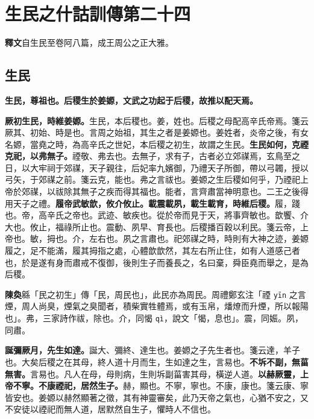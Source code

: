 \chapter{生民之什詁訓傳第二十四}

\begin{quoting}\textbf{釋文}自生民至卷阿八篇，成王周公之正大雅。\end{quoting}

\section{生民}


\textbf{生民，尊祖也。后稷生於姜嫄，文武之功起于后稷，故推以配天焉。}

\textbf{厥初生民，時維姜嫄。}{\footnotesize 生民，本后稷也。姜，姓也。后稷之母配高辛氏帝焉。箋云厥其、初始、時是也。言周之始祖，其生之者是姜嫄也。姜姓者，炎帝之後，有女名嫄，當堯之時，為高辛氏之世妃，本后稷之初生，故謂之生民。}\textbf{生民如何，克禋克祀，以弗無子。}{\footnotesize 禋敬、弗去也。去無子，求有子，古者必立郊禖焉，玄鳥至之日，以大牢祠于郊禖，天子親往，后妃率九嬪御，乃禮天子所御，帶以弓韣，授以弓矢，于郊禖之前。箋云克，能也。弗之言祓也。姜嫄之生后稷如何乎，乃禋祀上帝於郊禖，以祓除其無子之疾而得其福也。能者，言齊肅當神明意也。二王之後得用天子之禮。}\textbf{履帝武敏歆，攸介攸止。載震載夙，載生載育，時維后稷。}{\footnotesize 履，踐也。帝，高辛氏之帝也。武迹、敏疾也。從於帝而見于天，將事齊敏也。歆饗、介大也。攸止，福祿所止也。震動、夙早、育長也。后稷播百穀以利民。箋云帝，上帝也。敏，拇也。介，左右也。夙之言肅也。祀郊禖之時，時則有大神之迹，姜嫄履之，足不能滿，履其拇指之處，心體歆歆然，其左右所止住，如有人道感己者也，於是遂有身而肅戒不復御，後則生子而養長之，名曰棄，舜臣堯而舉之，是為后稷。}

\begin{quoting}\textbf{陳奐}緜「民之初生」傳「民，周民也」，此民亦為周民。周禮鄭玄注「禋 \texttt{yīn} 之言煙，周人尚臭，煙氣之臭聞者，積柴實牲體焉，或有玉帛，燔燎而升煙，所以報陽也」。弗，三家詩作祓，除也。介，同愒 \texttt{qì}，說文「愒，息也」。震，同娠。夙，同肅。\end{quoting}

\textbf{誕彌厥月，先生如達。}{\footnotesize 誕大、彌終、達生也。姜嫄之子先生者也。箋云達，羊子也。大矣后稷之在其母，終人道十月而生，生如達之生，言易也。}\textbf{不坼不副，無菑無害。}{\footnotesize 言易也。凡人在母，母則病，生則坼副菑害其母，橫逆人道。}\textbf{以赫厥靈，上帝不寧。不康禋祀，居然生子。}{\footnotesize 赫，顯也。不寧，寧也。不康，康也。箋云康、寧皆安也。姜嫄以赫然顯著之徵，其有神靈審矣，此乃天帝之氣也，心猶不安之，又不安徒以禋祀而無人道，居默然自生子，懼時人不信也。}

